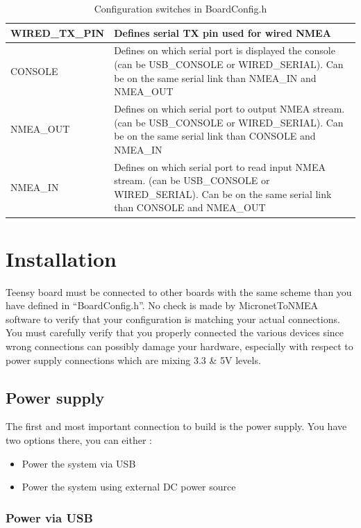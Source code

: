 \documentclass{report}
\begin{document}
\begin{table}[h]
\begin{tabular}{|l|p{12cm}|}
		\hline
		WIRED\_TX\_PIN & Defines serial TX pin used for wired NMEA\\
		\hline
		CONSOLE & Defines on which serial port is displayed the console (can be USB\_CONSOLE or WIRED\_SERIAL). Can be on the same serial link than NMEA\_IN and NMEA\_OUT\\
		\hline
		NMEA\_OUT & Defines on which serial port to output NMEA stream. (can be USB\_CONSOLE or WIRED\_SERIAL). Can be on the same serial link than CONSOLE and NMEA\_IN\\
		\hline
		NMEA\_IN & Defines on which serial port to read input NMEA stream. (can be USB\_CONSOLE or WIRED\_SERIAL). Can be on the same serial link than CONSOLE and NMEA\_OUT\\
		\hline
\end{tabular}
	\caption{Configuration switches in BoardConfig.h}
\label{table:configswitches}
\end{table}

\chapter{Installation}

Teensy board must be connected to other boards with the same scheme than you have defined in “BoardConfig.h”. No check is made by MicronetToNMEA software to verify that your configuration is matching your actual connections. You must carefully verify that you properly connected the various devices since wrong connections can possibly damage your hardware, especially with respect to power supply connections which are mixing 3.3 \& 5V levels.

\section{Power supply}

The first and most important connection to build is the power supply. You have two options there, you can either :

\begin{itemize}
	\item Power the system via USB
	\item Power the system using external DC power source
\end{itemize}

\subsection{Power via USB}
\end{document}
